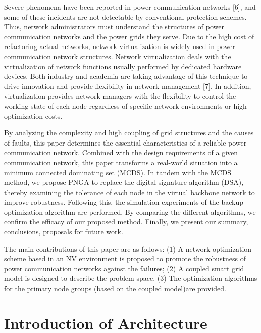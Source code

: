 \documentclass[AMA,STIX1COL]{WileyNJD-v2}
\begin{document}
\par Severe phenomena have been reported in power communication networks [6], and some of these incidents are not detectable by conventional protection schemes. Thus, network administrators must understand the structures of power communication networks and the power grids they serve. Due to the high cost of refactoring actual networks, network virtualization is widely used in power communication network structures. Network virtualization deals with the virtualization of network functions usually performed by dedicated hardware devices. Both industry and academia are taking advantage of this technique to drive innovation and provide flexibility in network management [7]. In addition, virtualization provides network managers with the flexibility to control the working state of each node regardless of specific network environments or high optimization costs.
\par By analyzing the complexity and high coupling of grid structures and the causes of faults, this paper determines the essential characteristics of a reliable power communication network. Combined with the design requirements of a given communication network, this paper transforms a real-world situation into a minimum connected dominating set (MCDS). In tandem with the MCDS method, we propose PNGA to replace the digital signature algorithm (DSA), thereby examining the tolerance of each node in the virtual backbone network to improve robustness. Following this, the simulation experiments of the backup optimization algorithm are performed. By comparing the different algorithms, we confirm the efficacy of our proposed method. Finally, we present our summary, conclusions, proposals for future work.

\par The main contributions of this paper are as follows: (1) A network-optimization scheme based in an NV environment is proposed to promote the robustness of power communication networks against the failures; (2) A coupled smart grid model is designed to describe the problem space. (3) The optimization algorithms for the primary node groups (based on the coupled model)are provided.
\section{Introduction of Architecture}\label{sec1}
\end{document}
